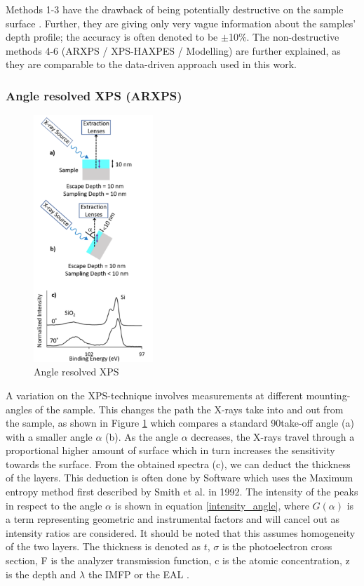 Methods 1-3 have the drawback of being potentially destructive on the sample surface \cite{greczynski_towards_2021}. Further, they are giving only very vague information about the samples’ depth profile; the accuracy is often denoted to be $\pm$10\%.
The non-destructive methods 4-6 (ARXPS / XPS-HAXPES / Modelling) are further explained, as they are comparable to the data-driven approach used in this work.

\subsubsection{Angle resolved XPS (ARXPS)}
\begin{figure}
    \centering
    \includegraphics[width=0.4\textwidth]{Figures/ARXPS.png}
    \caption{Angle resolved XPS \cite{stevie_introduction_2020}}
    \label{fig:arxps}
\end{figure}
A variation on the XPS-technique involves measurements at different mounting-angles of the sample.
This changes the path the X-rays take into and out from the sample, as shown in Figure \ref{fig:arxps} which compares a standard 90\textdegree take-off angle (a) with a smaller angle $\alpha$ (b). As the angle $\alpha$ decreases, the X-rays travel through a proportional higher amount of surface which in turn increases the sensitivity towards the surface. From the obtained spectra (c), we can deduct the thickness of the layers. This deduction is often done by Software which uses the Maximum entropy method first described by Smith et al. \cite{smith_maximum_1992} in 1992.
The intensity of the peaks in respect to the angle $\alpha$ is shown in equation \ref{intensity_angle}, where $G(\alpha)$ is a term representing geometric and instrumental factors and will cancel out as intensity ratios are considered. It should be noted that this assumes homogeneity of the two layers.
The thickness is denoted as $t$,
$\sigma$ is the photoelectron cross section,
F is the analyzer transmission function,
c is the atomic concentration,
z is the depth and $\lambda$ the IMFP or the EAL
\cite{paynter_arxps_2009}.

